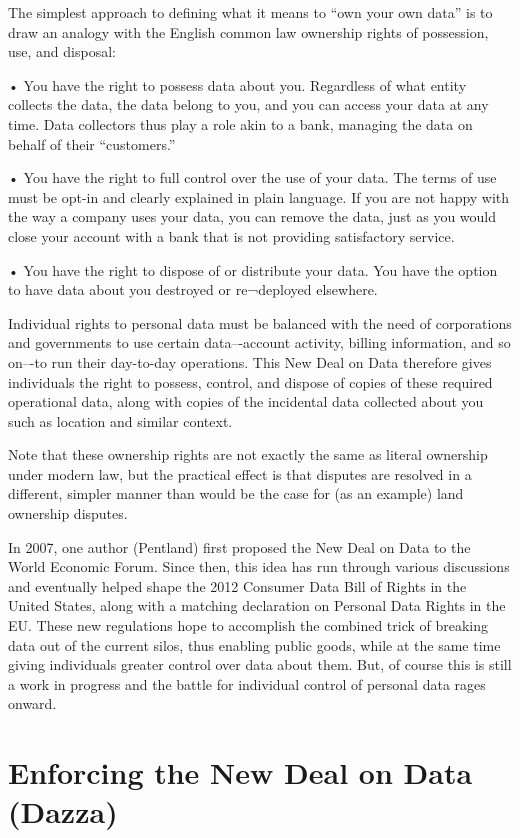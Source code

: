 The simplest approach to defining what it means to “own your own data” is to draw an analogy with the English common law ownership rights of possession, use, and disposal:

• You have the right to possess data about you. Regardless of what entity collects the data, the data belong to you, and you can access your data at any time. Data collectors thus play a role akin to a bank, managing the data on behalf of their “customers.”

• You have the right to full control over the use of your data. The terms of use must be opt-in and clearly explained in plain language. If you are not happy with the way a company uses your data, you can remove the data, just as you would close your account with a bank that is not providing satisfactory service.

• You have the right to dispose of or distribute your data. You have the option to have data about you destroyed or re¬deployed elsewhere.

Individual rights to personal data must be balanced with the need of corporations and governments to use certain data–-account activity, billing information, and so on–-to run their day-to-day operations.
This New Deal on Data therefore gives individuals the right to possess, control, and dispose of copies of these required operational data, along with copies of the incidental data collected about you such as location and similar context.

Note that these ownership rights are not exactly the same as literal ownership under modern law, but the practical effect is that disputes are resolved in a different, simpler manner than would be the case for (as an example) land ownership disputes.

In 2007, one author (Pentland) first proposed the New Deal on Data to the World Economic Forum. 
Since then, this idea has run through various discussions and eventually helped shape the 2012 Consumer Data Bill of Rights in the United States, along with a matching declaration on Personal Data Rights in the EU.
These new regulations hope to accomplish the combined trick of breaking data out of the current silos, thus enabling public goods, while at the same time giving individuals greater control over data about them.
But, of course this is still a work in progress and the battle for individual control of personal data rages onward.

\section{Enforcing the New Deal on Data (Dazza)}

